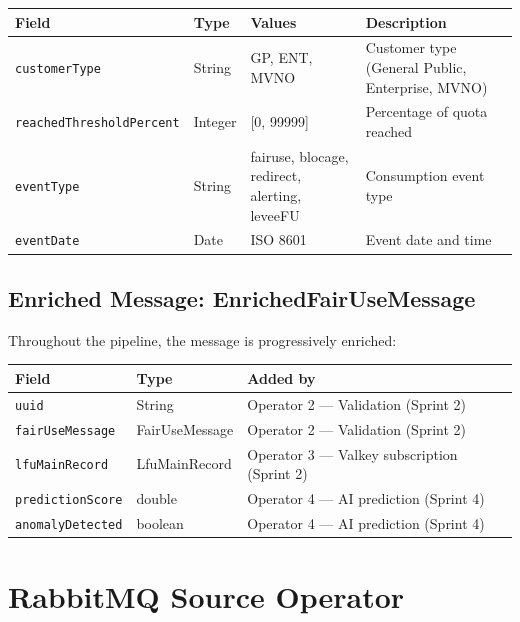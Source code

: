 \begin{center}
    \justifying
    \begin{tabularx}{\textwidth}{|l | l | p{4cm} | X|}
\toprule
\textbf{Field} & \textbf{Type} & \textbf{Values} & \textbf{Description} \\
\midrule
\texttt{customerType} & String & GP, ENT, MVNO & Customer type (General Public, Enterprise, MVNO) \\
\hline
\texttt{reachedThresholdPercent} & Integer & [0, 99999] & Percentage of quota reached \\
\hline
\texttt{eventType} & String & fairuse, blocage, redirect, alerting, leveeFU & Consumption event type \\
\hline
\texttt{eventDate} & Date & ISO 8601 & Event date and time \\
\bottomrule
    \end{tabularx}
    \label{tab:fairuse}
\end{center}


\subsection{Enriched Message: EnrichedFairUseMessage}

Throughout the pipeline, the message is progressively enriched:

\begin{center}
    \justifying
    \begin{tabularx}{\textwidth}{|l | l | X|}
\toprule
\textbf{Field} & \textbf{Type} & \textbf{Added by} \\
\midrule
\texttt{uuid} & String & Operator 2 --- Validation (Sprint 2) \\
\hline
\texttt{fairUseMessage} & FairUseMessage & Operator 2 --- Validation (Sprint 2) \\
\hline
\texttt{lfuMainRecord} & LfuMainRecord & Operator 3 --- Valkey subscription (Sprint 2) \\
\hline
\texttt{predictionScore} & double & Operator 4 --- AI prediction (Sprint 4) \\
\hline
\texttt{anomalyDetected} & boolean & Operator 4 --- AI prediction (Sprint 4) \\
\bottomrule
    \end{tabularx}
    \label{tab:enriched}
\end{center}


\section{RabbitMQ Source Operator}

